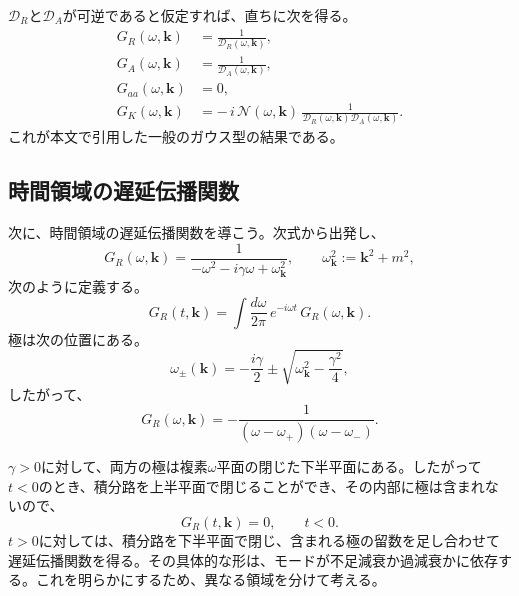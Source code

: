 \documentclass[a4paper,11pt,oneside]{article}
\theoremstyle{definition}
\numberwithin{equation}{section}
\begin{document}
\(\mathcal D_R\)と\(\mathcal D_A\)が可逆であると仮定すれば、直ちに次を得る。
\begin{align}
G_R(\omega,\mathbf k)
&=
\frac{1}{\mathcal D_R(\omega,\mathbf k)} ,
\\
G_A(\omega,\mathbf k)
&=
\frac{1}{\mathcal D_A(\omega,\mathbf k)} ,
\\
G_{aa}(\omega,\mathbf k)
&=0 ,
\\
G_K(\omega,\mathbf k)
&=
-\,i\,\mathcal N(\omega,\mathbf k)\,
\frac{1}{\mathcal D_R(\omega,\mathbf k)\mathcal D_A(\omega,\mathbf k)} .
\end{align}
これが本文で引用した一般のガウス型の結果である。





\subsection{時間領域の遅延伝播関数}\label{app:GK}



次に、時間領域の遅延伝播関数を導こう。次式から出発し、
\begin{equation}
G_R(\omega,\mathbf k)
=
\frac{1}{-\omega^2-i\gamma\omega+\omega_{\mathbf k}^2},
\qquad
\omega_{\mathbf k}^2:=\mathbf k^2+m^2,
\end{equation}
次のように定義する。
\begin{equation}
G_R(t,\mathbf k)
=
\int \frac{d\omega}{2\pi}\,
e^{-i\omega t}\,
G_R(\omega,\mathbf k).
\end{equation}
極は次の位置にある。
\begin{equation}
\omega_\pm(\mathbf k)
=
-\frac{i\gamma}{2}
\pm
\sqrt{\omega_{\mathbf k}^2-\frac{\gamma^2}{4}},
\end{equation}
したがって、
\begin{equation}
G_R(\omega,\mathbf k)
=
-\frac{1}{(\omega-\omega_+)(\omega-\omega_-)}.
\end{equation}


$\gamma>0$に対して、両方の極は複素$\omega$平面の閉じた下半平面にある。したがって$t<0$のとき、積分路を上半平面で閉じることができ、その内部に極は含まれないので、
\begin{equation}
G_R(t,\mathbf k)=0,
\qquad
t<0.
\end{equation}
$t>0$に対しては、積分路を下半平面で閉じ、含まれる極の留数を足し合わせて遅延伝播関数を得る。その具体的な形は、モードが不足減衰か過減衰かに依存する。これを明らかにするため、異なる領域を分けて考える。
\end{document}
